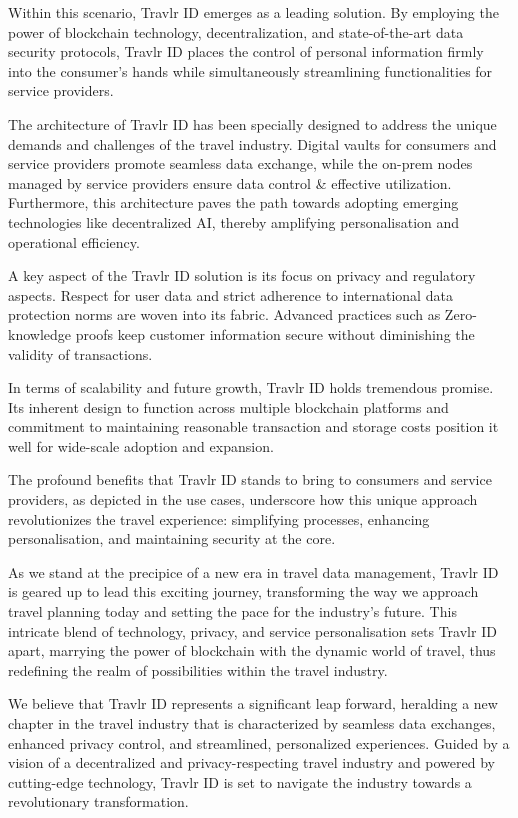 \documentclass{article}
\begin{document}
Within this scenario, Travlr ID emerges as a leading solution. By employing the power of blockchain technology, decentralization, and state-of-the-art data security protocols, Travlr ID places the control of personal information firmly into the consumer's hands while simultaneously streamlining functionalities for service providers. 

The architecture of Travlr ID has been specially designed to address the unique demands and challenges of the travel industry. Digital vaults for consumers and service providers promote seamless data exchange, while the on-prem nodes managed by service providers ensure data control \& effective utilization. Furthermore, this architecture paves the path towards adopting emerging technologies like decentralized AI, thereby amplifying personalisation and operational efficiency. 

A key aspect of the Travlr ID solution is its focus on privacy and regulatory aspects. Respect for user data and strict adherence to international data protection norms are woven into its fabric. Advanced practices such as Zero-knowledge proofs keep customer information secure without diminishing the validity of transactions. 

In terms of scalability and future growth, Travlr ID holds tremendous promise. Its inherent design to function across multiple blockchain platforms and commitment to maintaining reasonable transaction and storage costs position it well for wide-scale adoption and expansion. 

The profound benefits that Travlr ID stands to bring to consumers and service providers, as depicted in the use cases, underscore how this unique approach revolutionizes the travel experience: simplifying processes, enhancing personalisation, and maintaining security at the core. 

As we stand at the precipice of a new era in travel data management, Travlr ID is geared up to lead this exciting journey, transforming the way we approach travel planning today and setting the pace for the industry's future. This intricate blend of technology, privacy, and service personalisation sets Travlr ID apart, marrying the power of blockchain with the dynamic world of travel, thus redefining the realm of possibilities within the travel industry. 

We believe that Travlr ID represents a significant leap forward, heralding a new chapter in the travel industry that is characterized by seamless data exchanges, enhanced privacy control, and streamlined, personalized experiences. Guided by a vision of a decentralized and privacy-respecting travel industry and powered by cutting-edge technology, Travlr ID is set to navigate the industry towards a revolutionary transformation.
\end{document}
